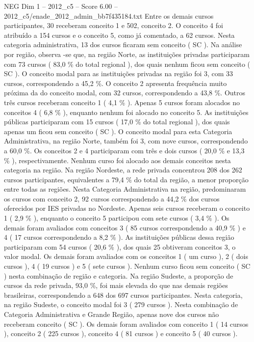 \begin{textsample}{NEG Dim 1 – 2012\_c5 – Score 6.00 – 2012\_c5/enade\_2012\_admin\_bb7f435184.txt}
Entre os demais cursos participantes, 30 receberam conceito 1 e 502, conceito 2.
O conceito 4 foi atribuído a 154 cursos e o conceito 5, como já comentado, a 62 cursos.
Nesta categoria administrativa, 13 dos cursos ficaram sem conceito ( SC ).
Na análise por região, observa -se que, na região Norte, as instituições privadas participaram com 73 cursos ( 83,0 \% do total regional ), dos quais nenhum ficou sem conceito ( SC ).
O conceito modal para as instituições privadas na região foi 3, com 33 cursos, correspondendo a 45,2 \%.
O conceito 2 apresenta frequência muito próxima da do conceito modal, com 32 cursos, correspondendo a 43,8 \%.
Outros três cursos receberam conceito 1 ( 4,1 \% ).
Apenas 5 cursos foram alocados no conceitos 4 ( 6,8 \% ), enquanto nenhum foi alocado no conceito 5.
As instituições públicas participaram com 15 cursos ( 17,0 \% do total regional ), dos quais apenas um ficou sem conceito ( SC ).
O conceito modal para esta Categoria Administrativa, na região Norte, também foi 3, com nove cursos, correspondendo a 60,0 \%.
Os conceitos 2 e 4 participaram com três e dois cursos ( 20,0 \% e 13,3 \% ), respectivamente.
Nenhum curso foi alocado aos demais conceitos nesta categoria na região.
Na região Nordeste, a rede privada concentrou 208 dos 262 cursos participantes, equivalentes a 79,4 \% do total da região, a menor proporção entre todas as regiões.
Nesta Categoria Administrativa na região, predominaram os cursos com conceito 2, 92 cursos correspondendo a 44,2 \% dos cursos oferecidos por IES privadas no Nordeste.
Apenas seis cursos receberam o conceito 1 ( 2,9 \% ), enquanto o conceito 5 participou com sete cursos ( 3,4 \% ).
Os demais foram avaliados com conceitos 3 ( 85 cursos correspondendo a 40,9 \% ) e 4 ( 17 cursos correspondendo a 8,2 \% ).
As instituições públicas dessa região participaram com 54 cursos ( 20,6 \% ), dos quais 25 obtiveram conceitos 3, o valor modal.
Os demais foram avaliados com os conceitos 1 ( um curso ), 2 ( dois cursos ), 4 ( 19 cursos ) e 5 ( sete cursos ).
Nenhum curso ficou sem conceito ( SC ) nesta combinação de região e categoria.
Na região Sudeste, a proporção de cursos da rede privada, 93,0 \%, foi mais elevada do que nas demais regiões brasileiras, correspondendo a 648 dos 697 cursos participantes.
Nesta categoria, na região Sudeste, o conceito modal foi 3 ( 279 cursos ).
Nesta combinação de Categoria Administrativa e Grande Região, apenas nove dos cursos não receberam conceito ( SC ).
Os demais foram avaliados com conceito 1 ( 14 cursos ), conceito 2 ( 225 cursos ), conceito 4 ( 81 cursos ) e conceito 5 ( 40 cursos ).

\end{textsample}
